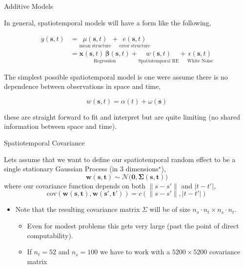 \documentclass[11pt,ignorenonframetext,]{beamer}
\begin{document}
\begin{frame}[t]{Additive Models}
\protect\hypertarget{additive-models}{}

In general, spatiotemporal models will have a form like the following,

\[
\begin{aligned}
y(\symbf{s},{t}) 
  &= \underset{\text{mean structure}}{\mu(\symbf{s},{t})} + \underset{\text{error structure}}{{e}(\symbf{s},{t})} \\
  &= \underset{\text{Regression}}{\symbf{x}(\symbf{s},{t}) \, \symbf{\beta}(\symbf{s},{t})} + \underset{\text{Spatiotemporal RE}}{{w}(\symbf{s},{t})} + \underset{\text{White Noise}}{\epsilon(\symbf{s},{t})}
\end{aligned} 
\]

\pause

\vspace{5mm}

The simplest possible spatiotemporal model is one were assume there is
no dependence between observations in space and time,

\[
w(\symbf{s},t) = \alpha(t) + \omega(\symbf{s})
\]

these are straight forward to fit and interpret but are quite limiting
(no shared information between space and time).

\end{frame}

\begin{frame}{Spatiotemporal Covariance}
\protect\hypertarget{spatiotemporal-covariance}{}

Lets assume that we want to define our spatiotemporal random effect to
be a single stationary Gaussian Process (in 3 dimensions\(^\star\)), \[ 
\symbf{w}(\symbf{s},\symbf{t}) \sim \mathcal{N}\big(\symbf{0}, \symbf{\Sigma}(\symbf{s},\symbf{t})\big) 
\] where our covariance function depends on both \(\lVert s-s'\rVert\)
and \(\lvert t-t'\rvert\), \[
\text{cov}(\symbf{w}(\symbf{s},\symbf{t}), \symbf{w}(\symbf{s}',\symbf{t}')) = c(\lVert s-s'\rVert, \lvert t-t'\rvert)
\]

\pause

\begin{itemize}
\item
  Note that the resulting covariance matrix \(\Sigma\) will be of size
  \(n_s \cdot n_t \times n_s \cdot n_t\).

  \begin{itemize}
  \item
    Even for modest problems this gets very large (past the point of
    direct computability).
  \item
    If \(n_t = 52\) and \(n_s = 100\) we have to work with a
    \(5200 \times 5200\) covariance matrix
  \end{itemize}
\end{itemize}

\end{frame}
\end{document}

